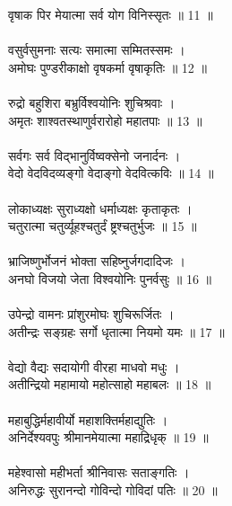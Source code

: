 वृषाक पिर मेयात्मा सर्व योग विनिस्सृतः ॥ 11 ॥\\
\\
वसुर्वसुमनाः सत्यः समात्मा सम्मितस्समः ।\\
अमोघः पुण्डरीकाक्षो वृषकर्मा वृषाकृतिः ॥ 12 ॥\\
\\
रुद्रो बहुशिरा बभ्रुर्विश्वयोनिः शुचिश्रवाः ।\\
अमृतः शाश्वतस्थाणुर्वरारोहो महातपाः ॥ 13 ॥\\
\\
सर्वगः सर्व विद्भानुर्विष्वक्सेनो जनार्दनः ।\\
वेदो वेदविदव्यङ्गो वेदाङ्गो वेदवित्कविः ॥ 14 ॥\\
\\
लोकाध्यक्षः सुराध्यक्षो धर्माध्यक्षः कृताकृतः ।\\
चतुरात्मा चतुर्व्यूहश्चतुर्दं ष्ट्रश्चतुर्भुजः ॥ 15 ॥\\
		\\
भ्राजिष्णुर्भोजनं भोक्ता सहिष्नुर्जगदादिजः ।\\
अनघो विजयो जेता विश्वयोनिः पुनर्वसुः ॥ 16 ॥\\
\\
उपेन्द्रो वामनः प्रांशुरमोघः शुचिरूर्जितः ।\\
अतीन्द्रः सङ्ग्रहः सर्गो धृतात्मा नियमो यमः ॥ 17 ॥\\
\\
वेद्यो वैद्यः सदायोगी वीरहा माधवो मधुः ।\\
अतीन्द्रियो महामायो महोत्साहो महाबलः ॥ 18 ॥\\
\\
महाबुद्धिर्महावीर्यो महाशक्तिर्महाद्युतिः ।\\
अनिर्देश्यवपुः श्रीमानमेयात्मा महाद्रिधृक् ॥ 19 ॥\\
\\
महेश्वासो महीभर्ता श्रीनिवासः सताङ्गतिः ।\\
अनिरुद्धः सुरानन्दो गोविन्दो गोविदां पतिः ॥ 20 ॥\\
